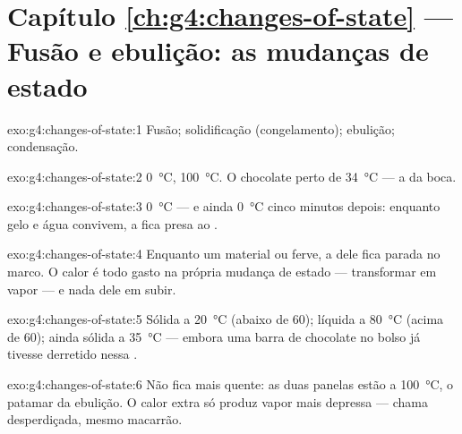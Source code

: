 \section*{Capítulo \ref{ch:g4:changes-of-state} --- Fusão e ebulição: as mudanças de estado}

\begin{solution}{exo:g4:changes-of-state:1}
Fusão; solidificação (congelamento); ebulição; condensação.
\end{solution}

\begin{solution}{exo:g4:changes-of-state:2}
 \qty{0}{\celsius}, 
\qty{100}{\celsius}. O chocolate  perto de \qty{34}{\celsius}
--- a  da boca.
\end{solution}

\begin{solution}{exo:g4:changes-of-state:3}
\qty{0}{\celsius} --- e ainda \qty{0}{\celsius} cinco minutos depois:
enquanto gelo e água convivem, a  fica presa ao .
\end{solution}

\begin{solution}{exo:g4:changes-of-state:4}
Enquanto um material  ou ferve, a  dele fica parada
no marco. O calor é todo gasto na própria mudança de estado ---
transformar  em vapor --- e nada dele em subir.
\end{solution}

\begin{solution}{exo:g4:changes-of-state:5}
Sólida a \qty{20}{\celsius} (abaixo de $60$); líquida a
\qty{80}{\celsius} (acima de $60$); ainda sólida a
\qty{35}{\celsius} --- embora uma barra de chocolate no bolso já
tivesse derretido nessa .
\end{solution}

\begin{solution}{exo:g4:changes-of-state:6}
Não fica mais quente: as duas panelas estão a \qty{100}{\celsius}, o
patamar da ebulição. O calor extra só produz vapor mais depressa ---
chama desperdiçada, mesmo macarrão.
\end{solution}

